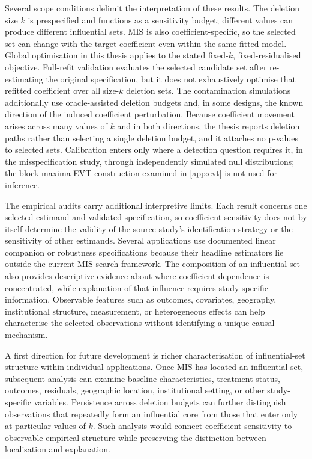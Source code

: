 \documentclass[../main.tex]{subfiles}
\begin{document}
Several scope conditions delimit the interpretation of these results. The deletion size \(k\) is prespecified and functions as a sensitivity budget; different values can produce different influential sets. MIS is also coefficient-specific, so the selected set can change with the target coefficient even within the same fitted model. Global optimisation in this thesis applies to the stated fixed-\(k\), fixed-residualised objective. Full-refit validation evaluates the selected candidate set after re-estimating the original specification, but it does not exhaustively optimise that refitted coefficient over all size-\(k\) deletion sets. The contamination simulations additionally use oracle-assisted deletion budgets and, in some designs, the known direction of the induced coefficient perturbation. Because coefficient movement arises across many values of $k$ and in both directions, the thesis reports deletion paths rather than selecting a single deletion budget, and it attaches no p-values to selected sets. Calibration enters only where a detection question requires it, in the misspecification study, through independently simulated null distributions; the block-maxima EVT construction examined in \autoref{app:evt} is not used for inference.

The empirical audits carry additional interpretive limits. Each result concerns one selected estimand and validated specification, so coefficient sensitivity does not by itself determine the validity of the source study's identification strategy or the sensitivity of other estimands. Several applications use documented linear companion or robustness specifications because their headline estimators lie outside the current MIS search framework. The composition of an influential set also provides descriptive evidence about where coefficient dependence is concentrated, while explanation of that influence requires study-specific information. Observable features such as outcomes, covariates, geography, institutional structure, measurement, or heterogeneous effects can help characterise the selected observations without identifying a unique causal mechanism.

A first direction for future development is richer characterisation of influential-set structure within individual applications. Once MIS has located an influential set, subsequent analysis can examine baseline characteristics, treatment status, outcomes, residuals, geographic location, institutional setting, or other study-specific variables. Persistence across deletion budgets can further distinguish observations that repeatedly form an influential core from those that enter only at particular values of \(k\). Such analysis would connect coefficient sensitivity to observable empirical structure while preserving the distinction between localisation and explanation.
\end{document}
